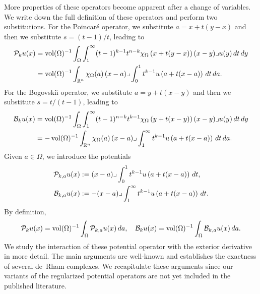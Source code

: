 \documentclass[10pt,a4paper]{article}
\begin{document}
More properties of these operators become apparent after a change of variables. 
We write down the full definition of these operators and perform two substitutions.
For the Poincar\'e operator, we substitute $a = x + t(y-x)$ and then we substitute $s = (t-1)/t$,
leading to 
\begin{align*}
    {\mathcal P}_{k} u(x) 
    &= 
    \operatorname{vol}(\Omega)^{-1}
    \int_{\Omega} \int_{1}^\infty (t-1)^{k-1}t^{n-k} 
    \chi_{\Omega}\left(x+t(y-x)\right) 
    (x-y)\lrcorner u(y) \,dt\,dy 
    \\
    &=
    \operatorname{vol}(\Omega)^{-1}
    \int_{{\mathbb R}^{n}} \chi_{\Omega}(a) \,(x-a)\lrcorner \int_{0}^{1} t^{k-1} u\left(a+t(x-a)\right)\,dt\,da
    .
\end{align*}
For the Bogovski\u{\i} operator, we substitute $a = y + t(x-y)$ and then we substitute $s = t/(t-1)$,
leading to 
\begin{align*}
    {\mathcal B}_{k} u(x) 
    &= 
    \operatorname{vol}(\Omega)^{-1}
    \int_{\Omega} \int_{1}^\infty (t-1)^{n-k}t^{k-1} 
    \chi_{\Omega}\left(y+t(x-y)\right) 
    (x-y)\lrcorner u(y) \,dt\,dy 
    \\
    &=
    - 
    \operatorname{vol}(\Omega)^{-1}
    \int_{{\mathbb R}^{n}} \chi_{\Omega}(a) \,(x-a)\lrcorner \int_{1}^\infty t^{k-1} u\left(a+t(x-a)\right)\,dt\,da
    .
\end{align*}
% 
Given $a \in \Omega$, we introduce the potentials 
\begin{align*}
    {\mathcal P}_{k,a} u(x) 
    &:= 
    (x-a)\lrcorner \int_{0}^{1} t^{k-1} u\left(a+t(x-a)\right)\,dt
    ,
    \\
    {\mathcal B}_{k,a} u(x) 
    &:= 
    - (x-a)\lrcorner \int_{1}^\infty t^{k-1} u\left(a+t(x-a)\right)\,dt
    .
\end{align*}
By definition,
\begin{align*}
    {\mathcal P}_{k} u(x) 
    =
    \operatorname{vol}(\Omega)^{-1}
    \int_{\Omega} {\mathcal P}_{k,a} u(x) \,da,
    \quad 
    {\mathcal B}_{k} u(x) 
    =
    \operatorname{vol}(\Omega)^{-1}
    \int_{\Omega} {\mathcal B}_{k,a} u(x) \,da
    .
\end{align*}
We study the interaction of these potential operator with the exterior derivative in more detail.
% 
The main arguments are well-known and establishes the exactness of several de~Rham complexes. 
We recapitulate these arguments since our variants of the regularized potential operators are not yet included in the published literature. 
\end{document}
